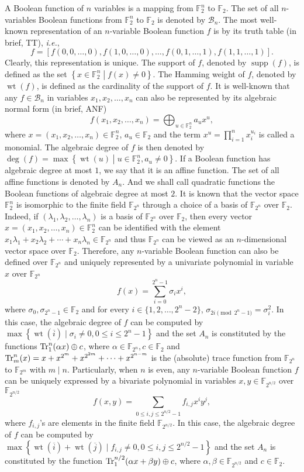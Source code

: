 \documentclass{article}
\newcommand{\F}{\mathbb{F}}
\newcommand{\0}{\textbf{0}}
\newcommand{\1}{\textbf{1}}
\newcommand{\wt}{\operatorname{wt}}
\theoremstyle{plain}
\begin{document}
    A Boolean function of $n$ variables is a mapping from $\F_2^n$ to $\F_2$.
    The set of all $n$-variables Boolean functions from $\F_2^n$ to $\F_2$ is denoted by $\mathcal{B}_n$.
    The most well-known representation of an $n$-variable Boolean function $f$ is by its truth table (in brief, TT), \emph{i.e.},
    \[f=\left[ f(0,0,\dots,0),f(1,0,\dots,0),\dots,f(0,1,\dots,1),f(1,1,\dots,1) \right].\]
    Clearly, this representation is unique.
    The support of $f$, denoted by $\operatorname{supp}(f)$, is defined as the set $\left\{ x\in\F_2^n\middle|f(x)\ne 0 \right\}$.
    The Hamming weight of $f$, denoted by $\wt(f)$, is defined as the cardinality of the support of $f$.
    It is well-known that any $f\in\mathcal{B}_n$ in variables $x_1,x_2,\dots,x_n$ can also be represented by its algebraic normal form (in brief, ANF)
    \[f(x_1,x_2,\dots,x_n) = \bigoplus_{u\in\F_2^n}a_ux^u,\]
    where $x=(x_1,x_2,\dots,x_n)\in\F_2^n$, $a_u\in\F_2$ and the term $x^{u}=\prod_{i=1}^nx_i^{u_i}$ is called a monomial.
    The algebraic degree of $f$ is then denoted by $\deg(f)=\max\left\{ \wt(u)\middle| u\in\F_2^n, a_u\ne 0 \right\}$.
    If a Boolean function has algebraic degree at most $1$, we say that it is an affine function.
    The set of all affine functions is denoted by $A_n$.
    And we shall call quadratic functions the Boolean functions of algebraic degree at most $2$.
    It is known that the vector space $\F_2^n$ is isomorphic to the finite field $\F_{2^n}$ through a choice of a basis of $\F_{2^n}$ over $\F_2$.
    Indeed, if $(\lambda_1,\lambda_2,\dots,\lambda_n)$ is a basis of $\F_{2^n}$ over $\F_2$, then every vector $x=(x_1,x_2,\dots,x_n)\in\F_2^n$ can be
    identified with the element $x_1\lambda_1+x_2\lambda_2+\cdots+x_n\lambda_n\in\F_{2^n}$ and thus $\F_{2^n}$ can be viewed as an $n$-dimensional vector space over $\F_2$.
    Therefore, any $n$-variable Boolean function can also be defined over $\F_{2^n}$ and uniquely represented by a univariate polynomial in variable $x$ over $\F_{2^n}$
    \[f(x) = \sum_{i=0}^{2^n-1}\sigma_ix^i,\]
    where $\sigma_0,\sigma_{2^n-1}\in\F_2$ and for every $i\in\{1,2,\dots,2^n-2\}$, $\sigma_{2i\pmod{2^n-1}}=\sigma_i^2$.
    In this case, the algebraic degree of $f$ can be computed by $\max\left\{ \wt(\overline{i})\mid \sigma_i\ne 0, 0\le i\le 2^n-1 \right\}$ and the set $A_n$ is constituted by the functions $\Tr_1^n(\alpha x)\oplus c$, where $\alpha\in\F_{2^n}, c\in\F_2$ and $ \Tr_m^n(x)=x+x^{2^m}+x^{2^{2m}}+\cdots+x^{2^{n-m}}$ is the (absolute) trace function from $\F_{2^n}$ to $\F_{2^m}$ with $m\mid n$.
    Particularly, when $n$ is even, any $n$-variable Boolean function $f$ can be uniquely expressed by a bivariate polynomial in variables $x,y\in\F_{2^{n/2}}$ over $\F_{2^{n/2}}$
    \[f(x,y)=\sum_{0\le i,j\le 2^{n/2}-1}f_{i,j}x^iy^j,\]
    where $f_{i,j}$'s are elements in the finite field $\F_{2^{n/2}}$.
    In this case, the algebraic degree of $f$ can be computed by $\max\left\{ \wt(\overline{i})+\wt(\overline{j})\mid f_{i,j}\ne 0, 0\le i,j\le 2^{n/2}-1 \right\}$ and the set $A_n$ is constituted by the function $\Tr_1^{n/2}(\alpha x+\beta y)\oplus c$, where $\alpha,\beta\in\F_{2^{n/2}}$ and $c\in\F_2$.
\end{document}
